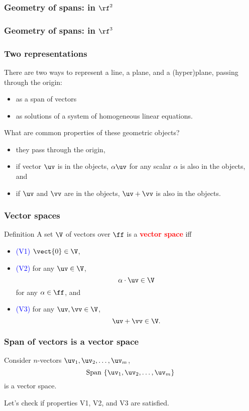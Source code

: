 \begin{frame}
  \frametitle{Geometry of spans: in $\rf^2$}
\end{frame}

\begin{frame}
  \frametitle{Geometry of spans: in $\rf^3$}
\end{frame}

\begin{frame}
  \frametitle{Two representations}

  There are two ways to represent a line, a plane, and a (hyper)plane,
  passing through the origin:
  \begin{itemize}
  \item as a span of vectors
  \item as solutions of a system of homogeneous linear equations.
  \end{itemize}

  \pause
  \vspace{0.2in}

  What are common properties of these geometric objects?
  \pause
  \begin{itemize}
  \item they pass through the origin,
  \item if vector $\uv$ is in the objects, $\alpha\uv$ for any scalar $\alpha$ is also in the objects, and
  \item if $\uv$ and $\vv$ are in the objects, $\uv+\vv$ is also in
    the objects.
  \end{itemize}
\end{frame}

\begin{frame}
  \frametitle{Vector spaces}
  \begin{block}{Definition}
    A set $\V$ of vectors over $\ff$ is a \textcolor{red}{\bf vector space} iff
    \begin{itemize}
    \item \textcolor{blue}{(V1)} $\vect{0}\in\V$,
    \item \textcolor{blue}{(V2)} for any $\uv\in\V$,
      \[
      \alpha\cdot\uv\in\V
      \]
      for any
      $\alpha\in\ff$, and
    \item \textcolor{blue}{(V3)} for any $\uv,\vv\in\V$,
      \[
      \uv+\vv\in\V.
      \]
    \end{itemize}
  \end{block}
\end{frame}

\begin{frame}
  \frametitle{Span of vectors is a vector space}
  Consider $n$-vectors $\uv_1,\uv_2,\ldots,\uv_m$,
  \[
  \mathrm{Span}\ \{\uv_1,\uv_2,\ldots,\uv_m\}
  \]
  is a vector space.

  \pause
  \vspace{0.2in}
  Let's check if properties V1, V2, and V3 are satisfied.
  \vspace{1.5in}
\end{frame}

